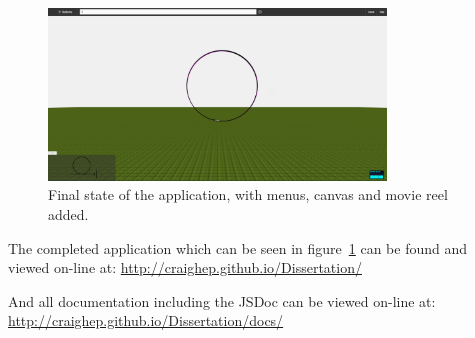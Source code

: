 \begin{figure}[h!]
	\centering
	\includegraphics[width=0.8\textwidth]{images/final.png}
	\caption{Final state of the application, with menus, canvas and movie reel added.}
	\label{fig:final}
\end{figure}

The completed application which can be seen in figure~\ref{fig:final} can be found and viewed on-line at: \url{http://craighep.github.io/Dissertation/}

And all documentation including the JSDoc can be viewed on-line at: \url{http://craighep.github.io/Dissertation/docs/}